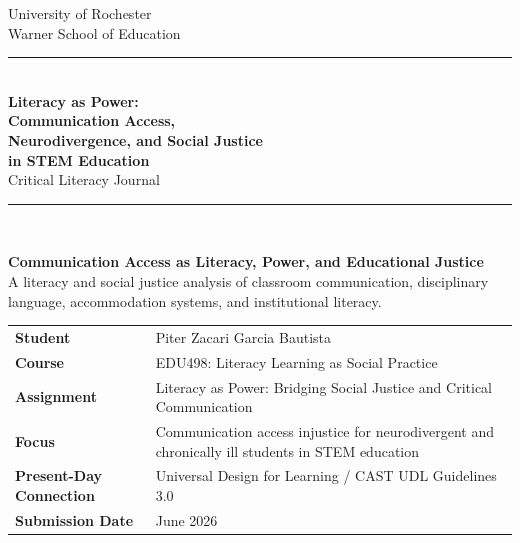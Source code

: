 \documentclass[11pt]{article}
\begin{document}
\begin{titlepage}
\thispagestyle{empty}

\begin{center}
{\large University of Rochester\\}
{\normalsize Warner School of Education\\[0.35in]}

{\color{PrimaryRed}\rule{\textwidth}{1.4pt}}\\[0.22in]
{\Huge\bfseries Literacy as Power:\\[0.08in] Communication Access,\\[0.08in] Neurodivergence, and Social Justice\\[0.08in] in STEM Education}\\[0.18in]
{\Large Critical Literacy Journal}\\[0.22in]
{\color{PrimaryRed}\rule{0.78\textwidth}{0.7pt}}\\[0.32in]

\colorbox{SoftBlue}{%
\parbox{0.88\textwidth}{%
\centering\vspace{0.12in}
\textbf{Communication Access as Literacy, Power, and Educational Justice}\\[0.05in]
A literacy and social justice analysis of classroom communication, disciplinary language, accommodation systems, and institutional literacy.
\vspace{0.12in}
}%
}
\end{center}

\vspace{0.25in}

\begin{center}
\renewcommand{\arraystretch}{1.15}
\setlength{\tabcolsep}{4pt}
\begin{tabular}{>{\bfseries\RaggedLeft}p{1.65in} p{4.9in}}
Student & Piter Zacari Garcia Bautista \\
Course & EDU498: Literacy Learning as Social Practice \\
Assignment & Literacy as Power: Bridging Social Justice and Critical Communication \\
Focus & Communication access injustice for neurodivergent and chronically ill students in STEM education \\
Present-Day Connection & Universal Design for Learning / CAST UDL Guidelines 3.0 \\
Submission Date & June 2026 \\
\end{tabular}
\end{center}


\end{titlepage}
\end{document}
